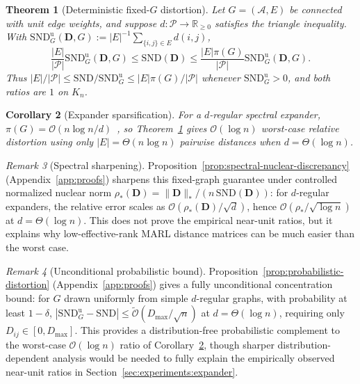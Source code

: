 \documentclass{article}
\theoremstyle{plain}
\newtheorem{theorem}{Theorem}
\newtheorem{corollary}[theorem]{Corollary}
\theoremstyle{definition}
\theoremstyle{remark}
\newtheorem{remark}[theorem]{Remark}
\newcommand{\R}{\mathbb{R}}
\newcommand{\Agents}{\mathcal{A}}        %
\newcommand{\Pairs}{\mathcal{P}}         %
\newcommand{\SND}{\ensuremath{\mathrm{SND}}}
\newcommand{\SNDG}{\mathrm{SND}_{G}}
\begin{document}
\begin{theorem}[Deterministic fixed-$G$ distortion]
\label{thm:distortion}
Let $G=(\Agents,E)$ be connected with unit edge weights, and suppose
$d:\Pairs\to\R_{\ge0}$ satisfies the triangle inequality. With
$\SNDG^{\mathrm{u}}(\mathbf{D},G):=|E|^{-1}\sum_{\{i,j\}\in E}d(i,j)$,
\begin{equation}
\label{eq:distortion}
\frac{|E|}{|\Pairs|}\SNDG^{\mathrm{u}}(\mathbf{D},G)
\leq \SND(\mathbf{D})
\leq
\frac{|E|\pi(G)}{|\Pairs|}\SNDG^{\mathrm{u}}(\mathbf{D},G).
\end{equation}
Thus $|E|/|\Pairs|\leq\SND/\SNDG^{\mathrm{u}}\leq|E|\pi(G)/|\Pairs|$
whenever $\SNDG^{\mathrm{u}}>0$, and both ratios are $1$ on $K_n$.
\end{theorem}

\begin{corollary}[Expander sparsification]
\label{cor:expander-distortion}
For a $d$-regular spectral expander,
$\pi(G)=\mathcal{O}(n\log n/d)$~\citep{leighton1999multicommodity}, so
Theorem~\ref{thm:distortion} gives $\mathcal{O}(\log n)$ worst-case
relative distortion using only $|E|=\Theta(n\log n)$ pairwise distances
when $d=\Theta(\log n)$.
\end{corollary}

\begin{remark}[Spectral sharpening]
\label{rem:main-spectral-sharpening}
Proposition~\ref{prop:spectral-nuclear-discrepancy} (Appendix~\ref{app:proofs})
sharpens this fixed-graph guarantee under controlled normalized nuclear
norm $\rho_*(\mathbf{D})=\|\mathbf{D}\|_*/(n\,\SND(\mathbf{D}))$: for
$d$-regular expanders, the relative error scales as
$\mathcal{O}(\rho_*(\mathbf{D})/\sqrt d)$, hence
$\mathcal{O}(\rho_*/\sqrt{\log n})$ at $d=\Theta(\log n)$. This does not
prove the empirical near-unit ratios, but it explains why low-effective-rank
MARL distance matrices can be much easier than the worst case.
\end{remark}

\begin{remark}[Unconditional probabilistic bound]
\label{rem:main-probabilistic-bound}
Proposition~\ref{prop:probabilistic-distortion} (Appendix~\ref{app:proofs})
gives a fully unconditional concentration bound: for $G$ drawn uniformly
from simple $d$-regular graphs, with probability at least $1-\delta$,
$|\SNDG^{\mathrm{u}}-\SND|\leq\widetilde{\mathcal{O}}(D_{\max}/\sqrt{n})$
at $d=\Theta(\log n)$, requiring only $D_{ij}\in[0,D_{\max}]$. This
provides a distribution-free probabilistic complement to the worst-case
$\mathcal{O}(\log n)$ ratio of
Corollary~\ref{cor:expander-distortion}, though sharper
distribution-dependent analysis would be needed to fully explain the
empirically observed near-unit ratios in
Section~\ref{sec:experiments:expander}.
\end{remark}
\end{document}
